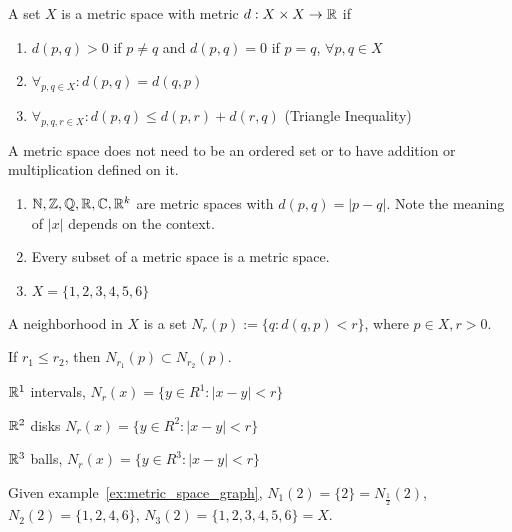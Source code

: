 \begin{definition}
	A set $X$ is a metric space with metric $d: X \times X \to \mathbb{R} $ if
	\begin{enumerate}
		\item $d(p,q)>0$ if $p\neq q$ and $d(p,q)=0$ if $p=q$, $\forall p,q \in X$
		\item $ \forall_{p,q \in X}: d(p,q)=d(q,p)$
		\item $ \forall_{p,q,r \in X}: d(p,q) \le d(p,r)+d(r,q)$ (Triangle Inequality)
	\end{enumerate}
	\begin{remark}
		A metric space does not need to be an ordered set or to have addition or multiplication defined on it.
	\end{remark}

\end{definition}
\begin{example}
	\begin{enumerate}
		\item $\mathbb{N} , \mathbb{Z} , \mathbb{Q} ,\mathbb{R} , \mathbb{C} , \mathbb{R}^{k}$ are metric spaces with $d(p,q)=|p-q|$. Note the meaning of $|x|$ depends on the context.
		\item Every subset of a metric space is a metric space.
		\item $X=\{1,2,3,4,5,6\} $ \label{ex:metric_space_graph}
		      \hfill \\
	\end{enumerate}
\end{example}
\begin{definition}[Neighborhood]
	A neighborhood in $X$ is a set $N_r(p):=\{q: d(q,p)<r\}$, where $p \in X, r>0$.
	\begin{remark}
		If $r_1 \le r_2$, then $N_{r_1}(p) \subset N_{r_2}(p)$.
	\end{remark}
\end{definition}
\begin{example}
	\item $\mathbb{R}^{1} $ intervals, $N_r(x)=\{y \in R^{1}: |x-y| < r\} $
	\item $\mathbb{R} ^2$ disks $N_r(x)=\{y \in R^2: |x-y|<r\} $
	\item $\mathbb{R} ^3$ balls, $N_r(x)=\{y \in R^3: |x-y|<r\} $
	\item Given example~\ref{ex:metric_space_graph}, $N_1(2)=\{2\}=N_{\frac{1}{2}}(2)$, $N_2(2)=\{1,2,4,6\}$, $N_3(2)=\{1,2,3,4,5,6\} = X$.
\end{example}
